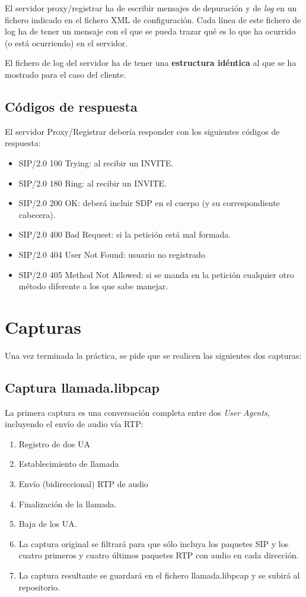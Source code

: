 \documentclass[a4paper,11pt]{article}
\begin{document}
El servidor proxy/registrar ha de escribir mensajes de depuración y de \emph{log} en un fichero indicado en el fichero XML de configuración. Cada línea de este fichero de log ha de tener un mensaje con el que se pueda trazar qué es lo que ha ocurrido (o está ocurriendo) en el servidor.

El fichero de log del servidor ha de tener una {\bf estructura idéntica} al que se
ha mostrado para el caso del cliente.

\subsection{Códigos de respuesta}

El servidor Proxy/Registrar debería responder con los siguientes códigos
de respuesta:

   \begin{itemize}
     \item SIP/2.0 100 Trying: al recibir un INVITE.
     \item SIP/2.0 180 Ring: al recibir un INVITE.
     \item SIP/2.0 200 OK: deberá incluir SDP en el cuerpo (y su correspondiente cabecera).
     \item SIP/2.0 400 Bad Request: si la petición está mal formada.
     \item SIP/2.0 404 User Not Found: usuario no registrado
     \item SIP/2.0 405 Method Not Allowed: si se manda en la petición cualquier otro método diferente a los que sabe manejar.
   \end{itemize}



\section{Capturas}

Una vez terminada la práctica, se pide que se realicen las 
siguientes dos capturas:

\subsection{Captura llamada.libpcap}

La primera captura es una conversación completa entre dos \emph{User Agents}, incluyendo el envío de audio vía RTP:

\begin{enumerate}
  \item Registro de dos UA
  \item Establecimiento de llamada
  \item Envío (bidireccional) RTP de audio
  \item Finalización de la llamada.
  \item Baja de los UA.
  \item La captura original se filtrará para que sólo incluya los paquetes
SIP y los cuatro primeros y cuatro últimos paquetes RTP con audio en cada dirección.
  \item La captura resultante se guardará en el fichero llamada.libpcap
y se subirá al repositorio.
\end{enumerate}
\end{document}
